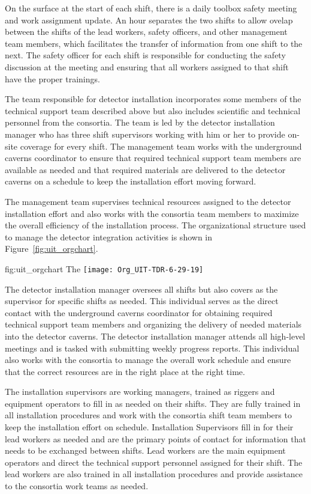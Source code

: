 On the surface at the start of each shift, there is a daily 
toolbox safety meeting and work assignment update. An hour 
separates the two shifts to allow ovelap between the shifts 
of the lead workers, safety officers, and other management 
team members, which facilitates the transfer of information 
from one shift to the next. The safety officer for each shift 
is responsible for conducting the safety discussion at the 
meeting and ensuring that all workers assigned to that shift 
have the proper trainings.

The team responsible for detector installation incorporates 
some members of the technical support team described above 
but also includes scientific and technical personnel from 
the  consortia.  The team is led by the detector 
installation manager who has three shift supervisors working 
with him or her to provide on-site coverage for every shift.
The management team works with the underground caverns 
coordinator to ensure that required technical support team 
members are available as needed and that required materials 
are delivered to the detector caverns on a schedule to keep
the installation effort moving forward.         

The management team supervises technical resources assigned to 
the detector installation effort and also works with the consortia 
team members to maximize the overall efficiency of the installation 
process.  The organizational structure used to manage the detector 
integration activities is shown in Figure~\ref{fig:uit_orgchart}.
\begin{dunefigure}{fig:uit_orgchart}
  {The }
  \texttt{[image: Org\_UIT-TDR-6-29-19]}
\end{dunefigure}

The detector installation manager oversees all shifts but also 
covers as the supervisor for specific shifts as needed.  This 
individual serves as the direct contact with the underground caverns 
coordinator for obtaining required technical support
team members and organizing the delivery of needed materials 
into the detector caverns.  The detector installation manager 
attends all high-level meetings and is tasked with submitting
weekly progress reports.  This individual also works with the 
 consortia to manage the overall work schedule 
and ensure that the correct resources are in the right place
at the right time. 
    
The installation supervisors are working managers, trained as 
riggers and equipment operators to fill in as needed on their 
shifts.  They are fully trained in all installation procedures
and work with the consortia shift team members to keep the 
installation effort on schedule.  Installation Supervisors 
fill in for their lead workers as needed and are the primary 
points of contact for information that needs to be exchanged 
between shifts.  Lead workers are the main equipment operators 
and direct the technical support personnel assigned for their 
shift.  The lead workers are also trained in all installation 
procedures and provide assistance to the consortia work teams 
as needed.  

